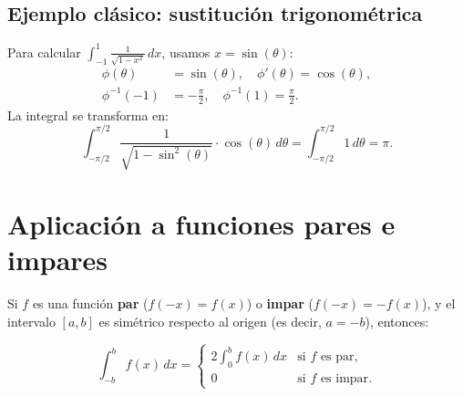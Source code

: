 \documentclass[12pt,a4paper]{article}
\begin{document}

%



\subsection{Ejemplo clásico: sustitución trigonométrica}
Para calcular $\int_{-1}^{1} \frac{1}{\sqrt{1 - x^2}} \, dx$, usamos $x = \sin(\theta)$:
\begin{align*}
    \phi(\theta) &= \sin(\theta), \quad \phi'(\theta) = \cos(\theta), \\
    \phi^{-1}(-1) &= -\frac{\pi}{2}, \quad \phi^{-1}(1) = \frac{\pi}{2}.
\end{align*}
La integral se transforma en:
\[
\int_{-\pi/2}^{\pi/2} \frac{1}{\sqrt{1 - \sin^2(\theta)}} \cdot \cos(\theta) \, d\theta = \int_{-\pi/2}^{\pi/2} 1 \, d\theta = \pi.
\]

\section{Aplicación a funciones pares e impares}
Si $f$ es una función \textbf{par} ($f(-x) = f(x)$) o \textbf{impar} ($f(-x) = -f(x)$), y el intervalo $[a, b]$ es simétrico respecto al origen (es decir, $a = -b$), entonces:

\[
\int_{-b}^{b} f(x) \, dx =
\begin{cases}
2 \displaystyle \int_{0}^{b} f(x) \, dx & \text{si } f \text{ es par}, \\
0 & \text{si } f \text{ es impar}.
\end{cases}
\]
\end{document}

